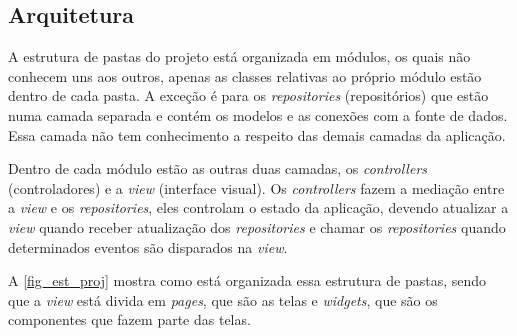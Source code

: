 \subsection{Arquitetura}

A estrutura de pastas do projeto está organizada em módulos, os quais não conhecem uns aos outros,
apenas as classes relativas ao próprio módulo estão dentro de cada pasta. A exceção é para os \emph{repositories} (repositórios)
que estão numa camada separada e contém os modelos e as conexões com a fonte de dados.
Essa camada não tem conhecimento a respeito das demais camadas da aplicação.

Dentro de cada módulo estão as outras duas camadas, os \emph{controllers} (controladores) e a \emph{view} (interface visual).
Os \emph{controllers} fazem a mediação entre a \emph{view} e os \emph{repositories}, eles controlam o estado da aplicação,
devendo atualizar a \emph{view} quando receber atualização dos \emph{repositories} e chamar os \emph{repositories}
quando determinados eventos são disparados na \emph{view}.

A \autoref{fig_est_proj} mostra como está organizada essa estrutura de pastas, sendo que a \emph{view}
está divida em \emph{pages}, que são as telas e \emph{widgets}, que são os componentes que fazem parte das telas.

\newpage

